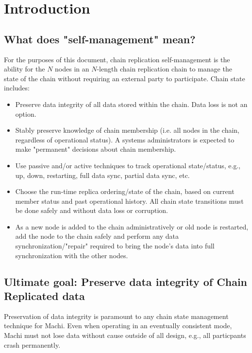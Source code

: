 \documentclass[preprint,10pt]{sigplanconf}
\begin{document}
\section{Introduction}
\label{sec:introduction}

\subsection{What does "self-management" mean?}
\label{sub:self-management}

For the purposes of this document, chain replication self-management
is the ability for the $N$ nodes in an $N$-length chain replication chain
to manage the state of the chain without requiring an external party
to participate.  Chain state includes:

\begin{itemize}
\item Preserve data integrity of all data stored within the chain.  Data
   loss is not an option.
\item Stably preserve knowledge of chain membership (i.e. all nodes in
   the chain, regardless of operational status). A systems
   administrators is expected to make "permanent" decisions about
   chain membership.
\item Use passive and/or active techniques to track operational
   state/status, e.g., up, down, restarting, full data sync, partial
   data sync, etc.
\item Choose the run-time replica ordering/state of the chain, based on
   current member status and past operational history.  All chain
   state transitions must be done safely and without data loss or
   corruption.
\item As a new node is added to the chain administratively or old node is
   restarted, add the node to the chain safely and perform any data
   synchronization/"repair" required to bring the node's data into
   full synchronization with the other nodes.
\end{itemize}

\subsection{Ultimate goal: Preserve data integrity of Chain Replicated data}

Preservation of data integrity is paramount to any chain state
management technique for Machi.  Even when operating in an eventually
consistent mode, Machi must not lose data without cause outside of all
design, e.g., all particpants crash permanently.
\end{document}
